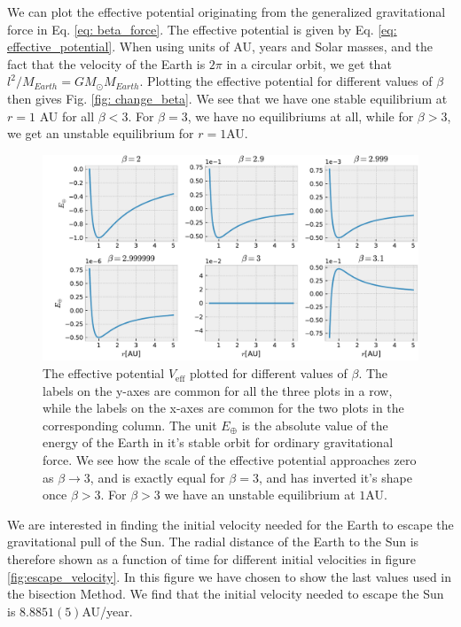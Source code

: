 \documentclass[%
 reprint,
nofootinbib,
aps,
]{revtex4-1}
\begin{document}
We can plot the effective potential originating from the generalized gravitational force in Eq. \eqref{eq: beta_force}. The effective potential is given by Eq. \eqref{eq: effective_potential}. When using units of AU, years and Solar masses, and the fact that the velocity of the Earth is $2\pi$ in a circular orbit, we get that $l^2/M_{Earth} = GM_\odot M_{Earth}$. Plotting the effective potential for different values of $\beta$ then gives Fig. \vref{fig: change_beta}. We see that we have one stable equilibrium at $r = 1$
AU for all $\beta < 3$. For $\beta = 3$, we have no equilibriums at all, while for $\beta > 3$, we get an unstable equilibrium for $r = 1$AU.

\begin{figure}
\centering
\hspace{-1.5cm}
\includegraphics[scale=0.8]{../figures/changing_beta.pdf}
\caption{The effective potential $V_{\mathrm{eff}}$ plotted for different values of $\beta$. The labels on the y-axes are common for all the three plots in a row, while the labels on the x-axes are common for the two plots in the corresponding column. The unit $E_\oplus$ is the absolute value of the energy of the Earth in it's stable orbit for ordinary gravitational force. We see how the scale of the effective potential approaches zero as $\beta\rightarrow 3$, and is exactly equal for $\beta=3$, and has inverted it's shape once $\beta >3$. For $\beta>3$ we have an unstable equilibrium at $1$AU.}
\label{fig: change_beta}
\end{figure}

We are interested in finding the initial velocity needed for the Earth to escape the gravitational pull of the Sun. The radial distance of the Earth to the Sun is therefore shown as a function of time for different initial velocities in figure \vref{fig:escape_velocity}. In this figure we have chosen to show the last values used in the bisection Method. We find that the initial velocity needed to escape the Sun is $8.8851(5)$AU/year.
\end{document}
